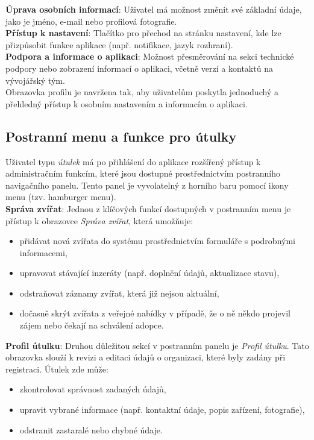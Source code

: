\documentclass[czech, bp, kiv, he, iso690numb, pdf]{fasthesis}
\begin{document}
    \noindent \textbf{Úprava osobních informací}: Uživatel má možnost změnit své základní údaje, jako je jméno, e-mail nebo profilová fotografie.\\

    \noindent \textbf{Přístup k nastavení}: Tlačítko pro přechod na stránku nastavení, kde lze přizpůsobit funkce aplikace (např. notifikace, jazyk rozhraní).\\

    \noindent \textbf{Podpora a informace o aplikaci}: Možnost přesměrování na sekci technické podpory nebo zobrazení informací o aplikaci, včetně verzí a kontaktů na vývojářský tým.\\

    \noindent Obrazovka profilu je navržena tak, aby uživatelům poskytla jednoduchý a přehledný přístup k osobním nastavením a informacím o aplikaci.

    \subsection{Postranní menu a funkce pro útulky}

    Uživatel typu \textit{útulek} má po přihlášení do aplikace rozšířený přístup k administračním funkcím, které jsou dostupné prostřednictvím postranního navigačního panelu. Tento panel je vyvolatelný z horního baru pomocí ikony menu (tzv. hamburger menu).\\

    \noindent \textbf{Správa zvířat}: Jednou z klíčových funkcí dostupných v postranním menu je přístup k obrazovce \textit{Správa zvířat}, která umožňuje:
    \begin{itemize}[leftmargin=2em]
        \item přidávat nová zvířata do systému prostřednictvím formuláře s podrobnými informacemi,
        \item upravovat stávající inzeráty (např. doplnění údajů, aktualizace stavu),
        \item odstraňovat záznamy zvířat, která již nejsou aktuální,
        \item dočasně skrýt zvířata z veřejné nabídky v případě, že o ně někdo projevil zájem nebo čekají na schválení adopce.
    \end{itemize}

    \noindent \textbf{Profil útulku}: Druhou důležitou sekcí v postranním panelu je \textit{Profil útulku}. Tato obrazovka slouží k revizi a editaci údajů o organizaci, které byly zadány při registraci. Útulek zde může:
    \begin{itemize}[leftmargin=2em]
        \item zkontrolovat správnost zadaných údajů,
        \item upravit vybrané informace (např. kontaktní údaje, popis zařízení, fotografie),
        \item odstranit zastaralé nebo chybné údaje.
    \end{itemize}
\end{document}

